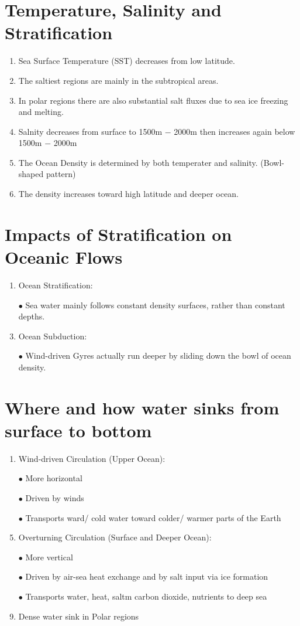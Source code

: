 \documentclass{report}
\begin{document}
\section{Temperature, Salinity and Stratification}
\begin{enumerate}
    \item Sea Surface Temperature (SST) decreases from low latitude.
    \item The saltiest regions are mainly in the subtropical areas.
    \item In polar regions there are also substantial salt fluxes due to sea ice freezing and melting.
    \item Salnity decreases from surface to 1500m $-$ 2000m then increases again below 1500m $-$  2000m
    \item The Ocean Density is determined by both temperater and salinity. (Bowl-shaped pattern)
    \item The density increases toward high latitude and deeper ocean.
\end{enumerate}


\section{Impacts of Stratification on Oceanic Flows}
\begin{enumerate}
    \item Ocean Stratification:
    \item [$\bullet$]Sea water mainly follows constant density surfaces, rather than constant depths.
    \item Ocean Subduction:
    \item [$\bullet$]Wind-driven Gyres actually run deeper by sliding down the bowl of ocean density.
\end{enumerate}


\section{Where and how water sinks from surface to bottom}
\begin{enumerate}
    \item Wind-driven Circulation (Upper Ocean):
    \item [$\bullet$]More horizontal
    \item [$\bullet$]Driven by winds
    \item [$\bullet$]Transports ward/ cold water toward colder/ warmer parts of the Earth
    \item Overturning Circulation (Surface and Deeper Ocean):
    \item [$\bullet$]More vertical
    \item [$\bullet$]Driven by air-sea heat exchange and by salt input via ice formation
    \item [$\bullet$]Transports water, heat, saltm carbon dioxide, nutrients to deep sea
    \item Dense water sink in Polar regions
\end{enumerate}
\end{document}
